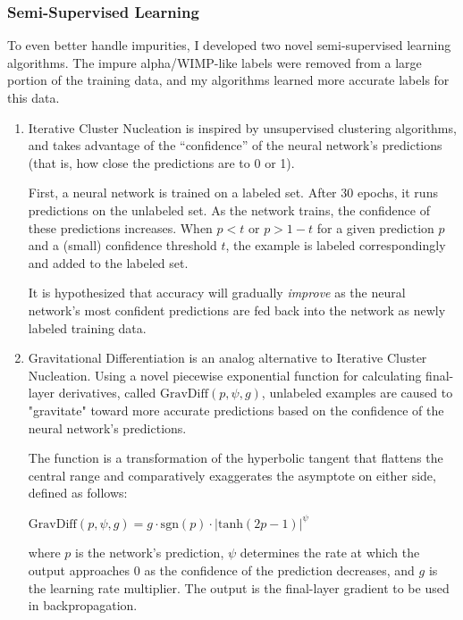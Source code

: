\documentclass[12pt]{article}
\begin{document}
\subsubsection{Semi-Supervised Learning}

To even better handle impurities, I developed two novel semi-supervised learning algorithms. The impure alpha/WIMP-like labels were removed from a large portion of the training data, and my algorithms learned more accurate labels for this data.

\begin{enumerate}
    \item Iterative Cluster Nucleation is inspired by unsupervised clustering algorithms, and takes advantage of the ``confidence'' of the neural network's predictions (that is, how close the predictions are to 0 or 1).
    
    First, a neural network is trained on a labeled set. After 30 epochs, it runs predictions on the unlabeled set. As the network trains, the confidence of these predictions increases. When $p < t$ or $p > 1 - t$ for a given prediction $p$ and a (small) confidence threshold $t$, the example is labeled correspondingly and added to the labeled set.

    It is hypothesized that accuracy will gradually \textit{improve} as the neural network's most confident predictions are fed back into the network as newly labeled training data.

    \item Gravitational Differentiation is an analog alternative to Iterative Cluster Nucleation. Using a novel piecewise exponential function for calculating final-layer derivatives, called $\mathrm{GravDiff}(p, \psi, g)$, unlabeled examples are caused to "gravitate" toward more accurate predictions based on the confidence of the neural network's predictions.

    The function is a transformation of the hyperbolic tangent that flattens the central range and comparatively exaggerates the asymptote on either side, defined as follows:
    \begin{center}
        $\mathrm{GravDiff}(p, \psi, g) = g \cdot \mathrm{sgn}(p) \cdot \lvert \mathrm{tanh}(2p - 1) \rvert ^ \psi$
    \end{center}
    where $p$ is the network's prediction, $\psi$ determines the rate at which the output approaches 0 as the confidence of the prediction decreases, and $g$ is the learning rate multiplier. The output is the final-layer gradient to be used in backpropagation.
\end{enumerate}
\end{document}
